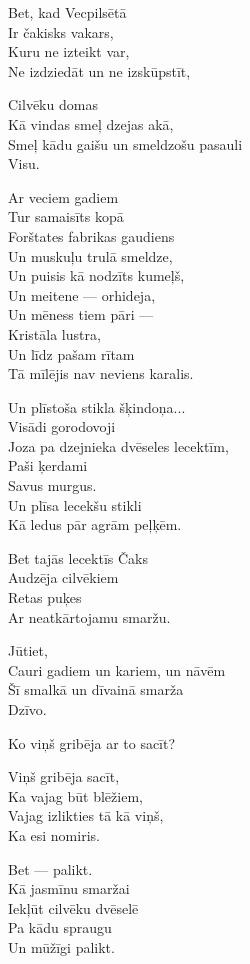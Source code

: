 \documentclass[14pt]{extarticle}
\begin{document}
Bet, kad Vecpilsētā\\
Ir čakisks vakars,\\
Kuru ne izteikt var,\\
Ne izdziedāt un ne izskūpstīt,

Cilvēku domas\\
Kā vindas smeļ dzejas akā,\\
Smeļ kādu gaišu un smeldzošu pasauli\\
Visu.

Ar veciem gadiem\\
Tur samaisīts kopā\\
Forštates fabrikas gaudiens\\
Un muskuļu trulā smeldze,\\
Un puisis kā nodzīts kumeļš,\\
Un meitene --- orhideja,\\
Un mēness tiem pāri ---\\
Kristāla lustra,\\
Un līdz pašam rītam\\
Tā mīlējis nav neviens karalis.

Un plīstoša stikla šķindoņa...\\
Visādi gorodovoji\\
Joza pa dzejnieka dvēseles lecektīm,\\
Paši ķerdami\\
Savus murgus.\\
Un plīsa lecekšu stikli\\
Kā ledus pār agrām peļķēm.

Bet tajās lecektīs Čaks\\
Audzēja cilvēkiem\\
Retas puķes\\
Ar neatkārtojamu smaržu.

Jūtiet,\\
Cauri gadiem un kariem, un nāvēm\\
Šī smalkā un dīvainā smarža\\
Dzīvo.

Ko viņš gribēja ar to sacīt?

Viņš gribēja sacīt,\\
Ka vajag būt blēžiem,\\
Vajag izlikties tā kā viņš,\\
Ka esi nomiris.

Bet --- palikt.\\
Kā jasmīnu smaržai\\
Iekļūt cilvēku dvēselē\\
Pa kādu spraugu\\
Un mūžīgi palikt.
\end{document}
